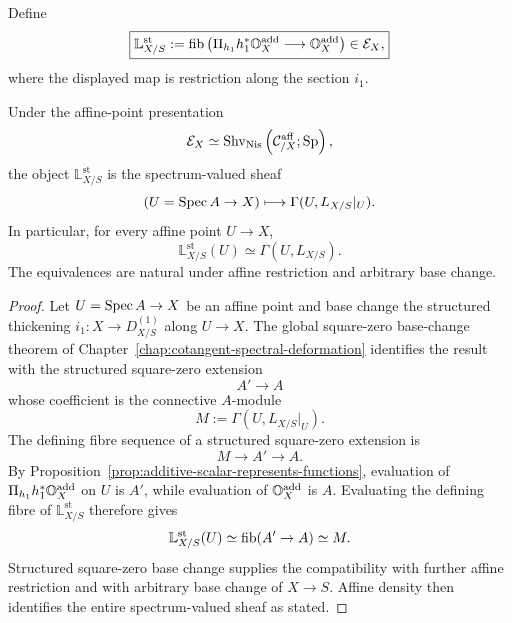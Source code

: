 \begin{definition}
\label{def:stabilized-cotangent-coefficient}
Define
\[
\boxed{
    \mathbb L^{\mathrm{st}}_{X/S}
    :=
    \operatorname{fib}
    \left(
        \Pi_{h_1}h_1^*\mathbb O_X^{\mathrm{add}}
        \longrightarrow
        \mathbb O_X^{\mathrm{add}}
    \right)
    \in
    \mathcal E_X,
}
\]
where the displayed map is restriction along the section \(i_1\).
\end{definition}

\begin{proposition}
\label{prop:stabilized-cotangent-is-cotangent}
Under the affine-point presentation
\[
    \mathcal E_X
    \simeq
    \operatorname{Shv}_{\mathrm{Nis}}
    \left(\mathcal C^{\mathrm{aff}}_{/X};\mathrm{Sp}\right),
\]
the object \(\mathbb L^{\mathrm{st}}_{X/S}\) is the spectrum-valued sheaf
\[
    (U=\operatorname{Spec} A\to X)
    \longmapsto
    \Gamma(U,L_{X/S}|_U).
\]
In particular, for every affine point \(U\to X\),
\[
\boxed{
    \mathbb L^{\mathrm{st}}_{X/S}(U)
    \simeq
    \Gamma(U,L_{X/S}).
}
\]
The equivalences are natural under affine restriction and arbitrary base change.
\end{proposition}

\begin{proof}
Let \(U=\operatorname{Spec} A\to X\) be an affine point and base change the structured thickening
\(i_1:X\to D^{(1)}_{X/S}\) along \(U\to X\).  The global square-zero base-change theorem of
Chapter~\ref{chap:cotangent-spectral-deformation} identifies the result with the structured
square-zero extension
\[
    A'\longrightarrow A
\]
whose coefficient is the connective \(A\)-module
\[
    M:=\Gamma(U,L_{X/S}|_U).
\]
The defining fibre sequence of a structured square-zero extension is
\[
    M\longrightarrow A'\longrightarrow A.
\]
By Proposition~\ref{prop:additive-scalar-represents-functions}, evaluation of
\(\Pi_{h_1}h_1^*\mathbb O_X^{\mathrm{add}}\) on \(U\) is \(A'\), while evaluation of
\(\mathbb O_X^{\mathrm{add}}\) is \(A\).  Evaluating the defining fibre of
\(\mathbb L^{\mathrm{st}}_{X/S}\) therefore gives
\[
    \mathbb L^{\mathrm{st}}_{X/S}(U)
    \simeq
    \operatorname{fib}(A'\to A)
    \simeq
    M.
\]
Structured square-zero base change supplies the compatibility with further affine restriction and
with arbitrary base change of \(X\to S\).  Affine density then identifies the entire
spectrum-valued sheaf as stated.
\end{proof}

